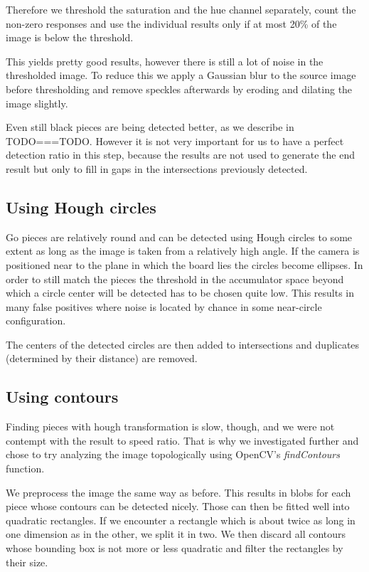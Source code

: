 	Therefore we threshold the saturation and the hue channel separately, count the non-zero responses and use the individual results only if at most 20\% of the image is below the threshold.

	This yields pretty good results, however there is still a lot of noise in the thresholded image. To reduce this we apply a Gaussian blur to the source image before thresholding and remove speckles afterwards by eroding and dilating the image slightly.

	Even still black pieces are being detected better, as we describe in TODO===TODO. However it is not very important for us to have a perfect detection ratio in this step, because the results are not used to generate the end result but only to fill in gaps in the intersections previously detected.
	\subsection{Using Hough circles}
	\label{detector-occluded-hough}
	Go pieces are relatively round and can be detected using Hough circles to some extent as long as the image is taken from a relatively high angle. If the camera is positioned near to the plane in which the board lies the circles become ellipses. In order to still match the pieces the threshold in the accumulator space beyond which a circle center will be detected has to be chosen quite low. This results in many false positives where noise is located by chance in some near-circle configuration.

	The centers of the detected circles are then added to intersections and duplicates (determined by their distance) are removed.

	\subsection{Using contours}
	\label{detector-occluded-contours}
	Finding pieces with hough transformation is slow, though, and we were not contempt with the result to speed ratio. That is why we investigated further and chose to try analyzing the image topologically using OpenCV's \emph{findContours} function.

	We preprocess the image the same way as before. This results in blobs for each piece whose contours can be detected nicely. Those can then be fitted well into quadratic rectangles. If we encounter a rectangle which is about twice as long in one dimension as in the other, we split it in two. We then discard all contours whose bounding box is not more or less quadratic and filter the rectangles by their size.

